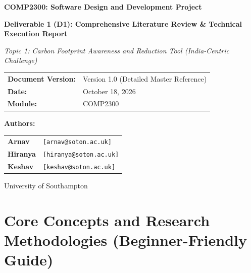 \documentclass[12pt, a4paper]{article}
\begin{document}
\begin{titlepage}
    \centering
    \vspace*{3cm}
    
    {\Huge \textbf{COMP2300: Software Design and Development Project} \par}
    \vspace{1.5cm}
    
    {\LARGE \textbf{Deliverable 1 (D1): Comprehensive Literature Review \& Technical Execution Report} \par}
    \vspace{0.5cm}
    {\Large \textit{Topic 1: Carbon Footprint Awareness and Reduction Tool (India-Centric Challenge)} \par}
    
    \vspace{2.5cm}
    
    \begin{tabular}{ll}
        \textbf{Document Version:} & Version 1.0 (Detailed Master Reference) \\
        \textbf{Date:} & October 18, 2026 \\
        \textbf{Module:} & COMP2300 \\
    \end{tabular}
    
    \vspace{2.5cm}
    
    {\large \textbf{Authors:} \par}
    \vspace{0.5cm}
    \begin{tabular}{ll}
        \textbf{Arnav} & \texttt{[arnav@soton.ac.uk]} \\
        \textbf{Hiranya} & \texttt{[hiranya@soton.ac.uk]} \\
        \textbf{Keshav} & \texttt{[keshav@soton.ac.uk]} \\
    \end{tabular}
    
    \vfill
    {\normalsize University of Southampton \par}
\end{titlepage}

\section{Core Concepts and Research Methodologies (Beginner-Friendly Guide)}
\end{document}
